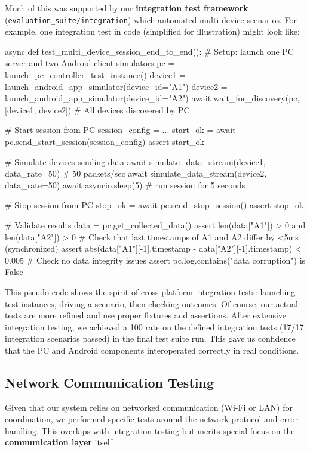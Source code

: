 \documentclass[11pt,a4paper]{report}
\begin{document}
Much of this was supported by our \textbf{integration test framework}
(\texttt{evaluation\_suite/integration}) which automated multi-device scenarios.
For example, one integration test in code (simplified for illustration)
might look like:

    async def test\_multi\_device\_session\_end\_to\_end():
        # Setup: launch one PC server and two Android client simulators
        pc = launch\_pc\_controller\_test\_instance()
        device1 = launch\_android\_app\_simulator(device\_id="A1")
        device2 = launch\_android\_app\_simulator(device\_id="A2")
        await wait\_for\_discovery(pc, [device1, device2])
        # All devices discovered by PC

        # Start session from PC
        session\_config = {...}
        start\_ok = await pc.send\_start\_session(session\_config)
        assert start\_ok

        # Simulate devices sending data
        await simulate\_data\_stream(device1, data\_rate=50)  # 50 packets/sec
        await simulate\_data\_stream(device2, data\_rate=50)
        await asyncio.sleep(5)  # run session for 5 seconds

        # Stop session from PC
        stop\_ok = await pc.send\_stop\_session()
        assert stop\_ok

        # Validate results
        data = pc.get\_collected\_data()
        assert len(data["A1"]) > 0 and len(data["A2"]) > 0
        # Check that last timestamps of A1 and A2 differ by <5ms (synchronized)
        assert abs(data["A1"][-1].timestamp - data["A2"][-1].timestamp) < 0.005
        # Check no data integrity issues
        assert pc.log.contains("data corruption") is False

This pseudo-code shows the spirit of cross-platform integration tests:
launching test instances, driving a scenario, then checking outcomes. Of
course, our actual tests are more refined and use proper fixtures and
assertions. After extensive integration testing, we achieved a 100%
rate on the defined integration tests (17/17 integration scenarios
passed) in the final test suite run. This gave us confidence that the PC
and Android components interoperated correctly in real conditions.

\subsection{Network Communication Testing}

Given that our system relies on networked communication (Wi-Fi or LAN)
for coordination, we performed specific tests around the network
protocol and error handling. This overlaps with integration testing but
merits special focus on the \textbf{communication layer} itself.
\end{document}
